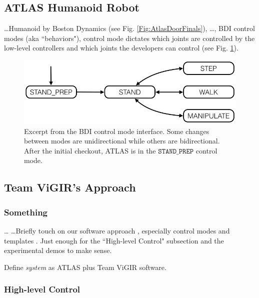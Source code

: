 
\subsection{ATLAS Humanoid Robot}

\ldots Humanoid by Boston Dynamics (see Fig. \ref{Fig:AtlasDoorFinals}), \ldots, BDI control modes (aka ``behaviors"), control mode dictates which joints are controlled by the low-level controllers and which joints the developers can control (see Fig. \ref{Fig:ControlModeTS}).

\begin{figure}[t]
\centering
\includegraphics[width=0.99\columnwidth,clip]{./img/control_modes_ts.png}
\caption{Excerpt from the BDI control mode interface.
Some changes between modes are unidirectional while others are bidirectional.
After the initial checkout, ATLAS is in the $\mathtt{STAND\_PREP}$ control mode.
}
\label{Fig:ControlModeTS}
\end{figure}

\subsection{Team ViGIR's Approach}

\subsubsection{Something}  \ldots \cite{ROS2009ICRA, ROS} \ldots Briefly touch on our software approach \cite{TeamViGIR2014JFR}, especially control modes and templates \cite{Alberto2014Humanoids}. Just enough for the ``High-level Control" subsection and the experimental demos to make sense.

Define \emph{system} as ATLAS plus Team ViGIR software.

\subsubsection{High-level Control} 

